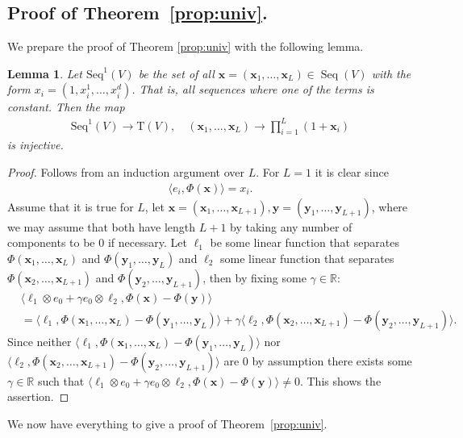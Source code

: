 \documentclass{article} \usepackage{iclr2021_conference,times}
\newcommand{\R}{\mathbb{R}}
\newcommand{\bx}{\mathbf{x}}
\newcommand{\by}{\mathbf{y}}
\newcommand{\T}[1]{\mathrm{T}({#1})}
\newcommand{\Seq}[1]{\operatorname{Seq}(#1)}
\theoremstyle{plain}
\newtheorem{lemma}[thm]{Lemma}
\theoremstyle{definition}
\begin{document}
\subsection{Proof of Theorem~\ref{prop:univ}.}\label{app:proof universality}	
We prepare the proof of Theorem \ref{prop:univ} with the following lemma.
	\begin{lemma} \label{lem:inject}
		Let $ \mathrm{Seq}^1(V) $ be the set of all $ \bx = (\bx_1, \ldots, \bx_L) \in \Seq{V} $ with the form $ x_i = (1, x_i^1, \ldots, x_i^d) $. That is, all sequences where one of the terms is constant. Then the map
		\begin{align}
		\mathrm{Seq}^1(V) \to \T{V}, \quad (\bx_1, \ldots, \bx_L) \to \prod_{i=1}^L (1 + \bx_i)
		\end{align}
		is injective.
	\end{lemma}
	\begin{proof}
		Follows from an induction argument over $ L $. For $ L=1 $ it is clear since
		\begin{align}
		\langle e_i, \Phi(\bx)\rangle = x_i.
		\end{align}
		Assume that it is true for $ L $, let $ \bx = (\bx_1, \ldots, \bx_{L+1}), \by = (\by_1, \ldots, \by_{L+1}) $, where we may assume that both have length $ L+1 $ by taking any number of components to be $ 0 $ if necessary. Let $ \ell_1 $ be some linear function that separates $ \Phi(\bx_1, \ldots, \bx_L) $ and $ \Phi(\by_1, \ldots, \by_L) $ and $ \ell_2 $ some linear function that separates $ \Phi(\bx_2, \ldots, \bx_{L+1}) $ and $ \Phi(\by_2, \ldots, \by_{L+1}) $, then by fixing some $ \gamma \in \R $:
		\begin{align}
		&\langle \ell_1\otimes e_0 + \gamma e_0\otimes \ell_2, \Phi(\bx)-\Phi(\by)\rangle \\
		&= \langle \ell_1, \Phi(\bx_1, \ldots, \bx_L)-\Phi(\by_1, \ldots, \by_L)\rangle + \gamma\langle \ell_2, \Phi(\bx_2, \ldots, \bx_{L+1})-\Phi(\by_2, \ldots, \by_{L+1})\rangle.
		\end{align}
		Since neither $ \langle \ell_1, \Phi(\bx_1, \ldots, \bx_L)-\Phi(\by_1, \ldots, \by_L)\rangle $ nor $ \langle \ell_2, \Phi(\bx_2, \ldots, \bx_{L+1})-\Phi(\by_2, \ldots, \by_{L+1})\rangle $ are $ 0 $ by assumption there exists some $ \gamma \in \R $ such that $ \langle \ell_1\otimes e_0 + \gamma e_0\otimes \ell_2, \Phi(\bx)-\Phi(\by)\rangle \not= 0 $. This shows the assertion.
	\end{proof}
  We now have everything to give a proof of Theorem~\ref{prop:univ}.
\end{document}
